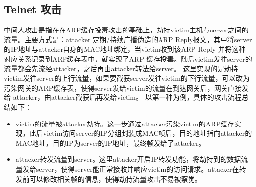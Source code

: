 \subsection{Telnet 攻击}
中间人攻击是指在在ARP缓存投毒攻击的基础上，劫持victim主机与server之间的流量。主要方式是：attacker
定期/持续广播伪造的ARP Reply报文，其中将server的IP地址与attacker自身的MAC地址绑定，当victim收到该ARP Reply
并将这种对应关系记录到ARP缓存表中，就实现了ARP 缓存投毒。随后victim发往server的流量都会先流经attacker，之后再由attacker转法给server。
这里实现的是劫持victim发往server的上行流量，如果要截获server发往victim的下行流量，可以改为污染网关的ARP缓存表，使得server发给victim的流量在到达网关后，网关直接发给
attacker，由attacker截获后再发给victim。
以第一种为例，具体的攻击流程总结如下：
\begin{itemize}
    \item[1] victim的流量被attacker劫持。这一步通过attacker污染victim的ARP缓存实现，此后victim访问server的IP分组封装成MAC帧后，目的地址指向attacker的MAC地址，目的IP为server的IP地址，最终帧发给了attacker。
    \item[2] attacker转发流量到server。这里attacker开启IP转发功能，将劫持到的数据流量发给server，使得server能正常接收并响应victim的访问请求。attacker在转发前可以修改相关帧的信息，使得劫持流量攻击不易被察觉。
\end{itemize}